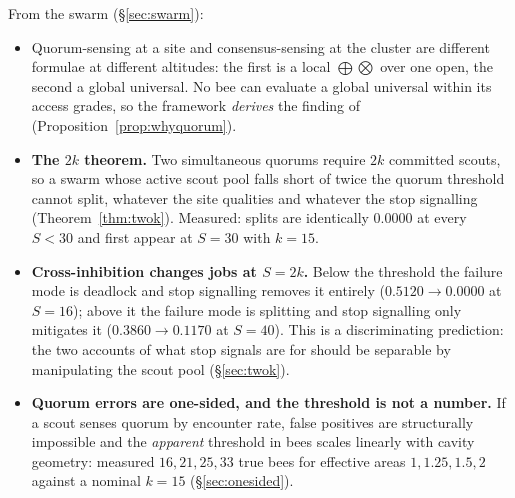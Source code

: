 \documentclass[11pt,a4paper]{article}
\theoremstyle{plain}
\theoremstyle{definition}
\theoremstyle{remark}
\begin{document}
\noindent From the swarm (\S\ref{sec:swarm}):
\begin{itemize}[leftmargin=1.4em]
\item Quorum-sensing at a site and consensus-sensing at the cluster are
      different formulae at different altitudes: the first is a local
      $\bigoplus\bigotimes$ over one open, the second a global universal. No
      bee can evaluate a global universal within its access grades, so the
      framework \emph{derives} the finding of \cite{SV04}
      (Proposition~\ref{prop:whyquorum}).
\item \textbf{The $2k$ theorem.} Two simultaneous quorums require $2k$
      committed scouts, so a swarm whose active scout pool falls short of twice
      the quorum threshold cannot split, whatever the site qualities and
      whatever the stop signalling (Theorem~\ref{thm:twok}). Measured: splits
      are identically $0.0000$ at every $S < 30$ and first appear at $S = 30$
      with $k = 15$.
\item \textbf{Cross-inhibition changes jobs at $S = 2k$.} Below the threshold
      the failure mode is deadlock and stop signalling removes it entirely
      ($0.5120 \to 0.0000$ at $S = 16$); above it the failure mode is splitting
      and stop signalling only mitigates it ($0.3860 \to 0.1170$ at $S = 40$).
      This is a discriminating prediction: the two accounts of what stop
      signals are for should be separable by manipulating the scout pool
      (\S\ref{sec:twok}).
\item \textbf{Quorum errors are one-sided, and the threshold is not a number.}
      If a scout senses quorum by encounter rate, false positives are
      structurally impossible and the \emph{apparent} threshold in bees scales
      linearly with cavity geometry: measured $16, 21, 25, 33$ true bees for
      effective areas $1, 1.25, 1.5, 2$ against a nominal $k = 15$
      (\S\ref{sec:onesided}).
\end{itemize}
\end{document}
